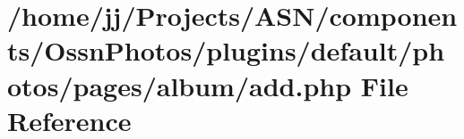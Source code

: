 \hypertarget{components_2_ossn_photos_2plugins_2default_2photos_2pages_2album_2add_8php}{}\section{/home/jj/\+Projects/\+A\+S\+N/components/\+Ossn\+Photos/plugins/default/photos/pages/album/add.php File Reference}
\label{components_2_ossn_photos_2plugins_2default_2photos_2pages_2album_2add_8php}
